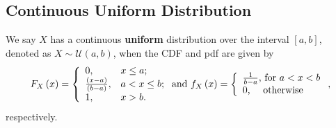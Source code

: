 \documentclass[notes=show,smaller,handout]{beamer}\usepackage[]{graphicx}\usepackage[]{color}
\begin{document}
\subsection{Continuous Uniform Distribution}

\begin{frame}{\subsecname}

\begin{definition}
We say $X$ has a continuous \textbf{uniform} distribution over the
interval $[a,b]$, denoted as $X\sim \mathcal{U}(a,b)$, when the CDF and pdf are
given by
$$
{F_X\left( x\right)}=\left\{
                           \begin{array}{ll}
                             0, & \hbox{$x\leq a$;} \\
                             \frac{(x-a)}{(b-a)}, & \hbox{$a<x\leq b$;} \\
                             1, & \hbox{$x>b$.}
                           \end{array}
                         \right.\mbox{\color{black}and}~{f_{X}\left( x\right)} =\left\{
\begin{array}{l}
\frac{1}{b-a}\text{, for }a<x<b \\
0\text{, \quad otherwise}%
\end{array}%
\right. ,
$$
respectively.
\end{definition}
\end{frame}%
\end{document}
